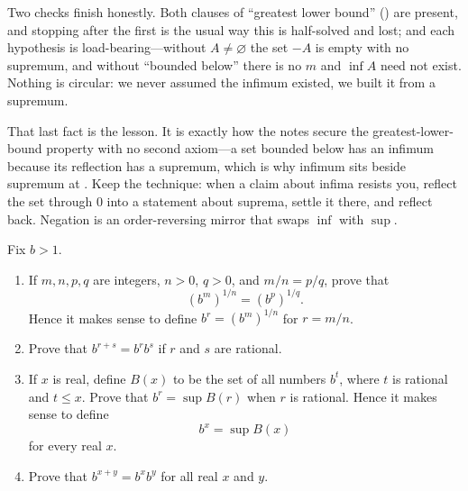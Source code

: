 \documentclass[main.tex]{subfiles}
\begin{document}
\begin{Reflection}
Two checks finish honestly. Both clauses of ``greatest lower bound'' () are present, and
stopping after the first is the usual way this is half-solved and lost; and each hypothesis is
load-bearing---without $A\neq\varnothing$ the set $-A$ is empty with no supremum, and without ``bounded
below'' there is no $m$ and $\inf A$ need not exist. Nothing is circular: we never assumed the infimum
existed, we built it from a supremum.

That last fact is the lesson. It is exactly how the notes secure the greatest-lower-bound property with
no second axiom---a set bounded below has an infimum because its reflection has a supremum, which is
why infimum sits beside supremum at . Keep the technique: when a claim about infima
resists you, reflect the set through $0$ into a statement about suprema, settle it there, and reflect
back. Negation is an order-reversing mirror that swaps $\inf$ with $\sup$.
\end{Reflection}

Fix $b>1$.
\begin{enumerate}[leftmargin=1.7em,itemsep=3pt,topsep=2pt,label=\textnormal{(\alph*)}]
  \item If $m,n,p,q$ are integers, $n>0$, $q>0$, and $m/n=p/q$, prove that
  \[
  (b^m)^{1/n}=(b^p)^{1/q}.
  \]
  Hence it makes sense to define $b^r=(b^m)^{1/n}$ for $r=m/n$.
  \item Prove that $b^{r+s}=b^r b^s$ if $r$ and $s$ are rational.
  \item If $x$ is real, define $B(x)$ to be the set of all numbers $b^t$, where $t$ is rational and
  $t\le x$. Prove that $b^r=\sup B(r)$ when $r$ is rational. Hence it makes sense to define
  \[
  b^x=\sup B(x)
  \]
  for every real $x$.
  \item Prove that $b^{x+y}=b^x b^y$ for all real $x$ and $y$.
\end{enumerate}
\end{document}
